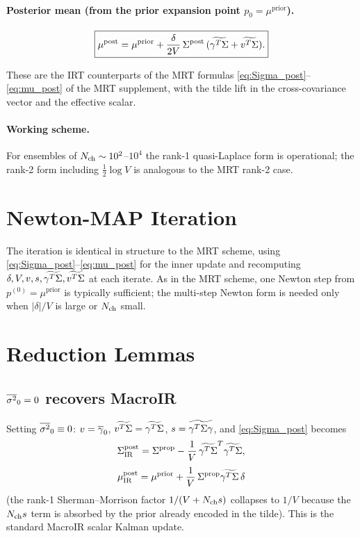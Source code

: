 \documentclass[11pt]{article}
\begin{document}
\paragraph{Posterior mean (from the prior expansion point $p_0=\mu^{\mathrm{prior}}$).}
\begin{equation}
  \boxed{
    \mu^{\mathrm{post}}
    = \mu^{\mathrm{prior}}
    + \frac{\delta}{2V}\,\Sigma^{\mathrm{post}}\,(\widetilde{\gamma^{T}\Sigma} + \widetilde{v^{T}\Sigma}).
  }
  \label{eq:mu_post}
\end{equation}

These are the IRT counterparts of the MRT formulas
\eqref{eq:Sigma_post}--\eqref{eq:mu_post} of the MRT supplement, with
the tilde lift in the cross-covariance vector and the effective
scalar.

\paragraph{Working scheme.}
For ensembles of $N_{\mathrm{ch}}\sim 10^2$--$10^4$ the rank-1 quasi-Laplace
form is operational; the rank-2 form including $\tfrac12\log V$ is
analogous to the MRT rank-2 case.

\section{Newton-MAP Iteration}

The iteration is identical in structure to the MRT scheme, using
\eqref{eq:Sigma_post}--\eqref{eq:mu_post} for the inner update and
recomputing $\delta,V,v,s,\widetilde{\gamma^{T}\Sigma},\widetilde{v^{T}\Sigma}$ at each iterate. As in
the MRT scheme, one Newton step from $p^{(0)}=\mu^{\mathrm{prior}}$ is
typically sufficient; the multi-step Newton form is needed only when
$|\delta|/V$ is large or $N_{\mathrm{ch}}$ small.

\section{Reduction Lemmas}

\subsection{$\overline{\sigma^2}_0=0$ recovers MacroIR}

Setting $\overline{\sigma^2}_0\equiv 0$:
$v=\overline{\gamma}_0$, $\widetilde{v^{T}\Sigma}=\widetilde{\gamma^{T}\Sigma}$, $s=\widetilde{\gamma^{T}\Sigma\gamma}$, and \eqref{eq:Sigma_post}
becomes
\[
  \Sigma^{\mathrm{post}}_{\mathrm{IR}}
  = \Sigma^{\mathrm{prop}} - \frac{1}{V}\,\widetilde{\gamma^{T}\Sigma}^{T}\widetilde{\gamma^{T}\Sigma},
\]
\[
  \mu^{\mathrm{post}}_{\mathrm{IR}}
  = \mu^{\mathrm{prior}} + \frac{1}{V}\,\Sigma^{\mathrm{prop}}\widetilde{\gamma^{T}\Sigma}\,\delta
\]
(the rank-1 Sherman--Morrison factor $1/(V+N_{\mathrm{ch}} s)$ collapses to
$1/V$ because the $N_{\mathrm{ch}} s$ term is absorbed by the prior already
encoded in the tilde). This is the standard MacroIR scalar Kalman
update.
\end{document}
